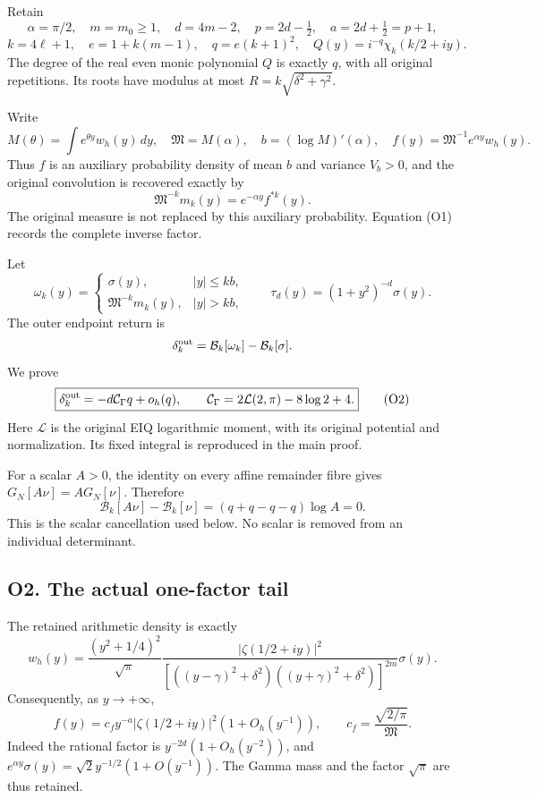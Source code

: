 \documentclass[11pt,a4paper]{article}
\begin{document}
Retain \[
\alpha=\pi/2,\quad m=m_0\ge1,\quad d=4m-2,\quad
p=2d-\tfrac12,\quad a=2d+\tfrac12=p+1,
\] \[
k=4\ell+1,\quad e=1+k(m-1),\quad q=e(k+1)^2,
\quad Q(y)=i^{-q}\chi_k(k/2+iy).
\] The degree of the real even monic polynomial \(Q\) is exactly \(q\),
with all original repetitions. Its roots have modulus at most
\(R=k\sqrt{\delta^2+\gamma^2}\).

Write \[
M(\theta)=\int e^{\theta y}w_h(y)\,dy,\quad
\mathfrak M=M(\alpha),\quad b=(\log M)'(\alpha),
\quad f(y)=\mathfrak M^{-1}e^{\alpha y}w_h(y).
\] Thus \(f\) is an auxiliary probability density of mean \(b\) and
variance \(V_b>0\), and the original convolution is recovered exactly by
\[
\boxed{\mathfrak M^{-k}m_k(y)=e^{-\alpha y}f^{*k}(y).}\tag{O1}
\] The original measure is not replaced by this auxiliary probability.
Equation (O1) records the complete inverse factor.

Let \[
\omega_k(y)=\begin{cases}\sigma(y),&|y|\le kb,\\
\mathfrak M^{-k}m_k(y),&|y|>kb,
\end{cases}
\qquad \tau_d(y)=(1+y^2)^{-d}\sigma(y).
\] The outer endpoint return is \[
\delta_k^{\rm out}=\mathcal B_k[\omega_k]-\mathcal B_k[\sigma].
\] We prove \[
\boxed{\delta_k^{\rm out}=-d\mathcal C_\Gamma q+o_h(q),
\qquad \mathcal C_\Gamma=2\mathcal L(2,\pi)-8\log2+4.}\tag{O2}
\] Here \(\mathcal L\) is the original EIQ logarithmic moment, with its
original potential and normalization. Its fixed integral is reproduced
in the main proof.

For a scalar \(A>0\), the identity on every affine remainder fibre gives
\(G_N[A\nu]=A G_N[\nu]\). Therefore \[
\mathcal B_k[A\nu]-\mathcal B_k[\nu]
=(q+q-q-q)\log A=0.\tag{O3}
\] This is the scalar cancellation used below. No scalar is removed from
an individual determinant.

\subsection{O2. The actual one-factor
tail}\label{sa:o2.-the-actual-one-factor-tail}

The retained arithmetic density is exactly \[
w_h(y)=\frac{(y^2+1/4)^2}{\sqrt\pi}
\frac{|\zeta(1/2+iy)|^2}
{[((y-\gamma)^2+\delta^2)((y+\gamma)^2+\delta^2)]^{2m}}
\sigma(y).
\] Consequently, as \(y\to+\infty\), \[
\boxed{f(y)=c_f y^{-a}|\zeta(1/2+iy)|^2(1+O_h(y^{-1})),
\qquad c_f=\frac{\sqrt{2/\pi}}{\mathfrak M}.}\tag{O4}
\] Indeed the rational factor is \(y^{-2d}(1+O_h(y^{-2}))\), and
\(e^{\alpha y}\sigma(y)=\sqrt2 y^{-1/2}(1+O(y^{-1}))\). The Gamma mass
and the factor \(\sqrt\pi\) are thus retained.
\end{document}

